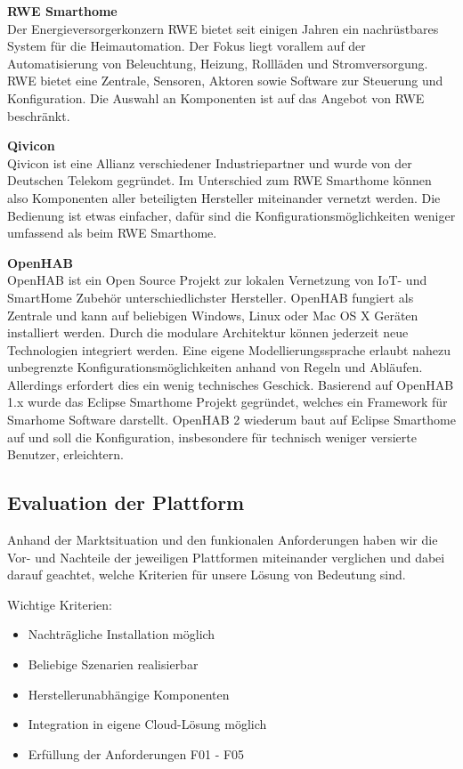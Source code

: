 \textbf{RWE Smarthome} \\
Der Energieversorgerkonzern RWE bietet seit einigen Jahren ein nachrüstbares System für die Heimautomation. Der Fokus liegt vorallem auf der Automatisierung von Beleuchtung, Heizung, Rollläden und Stromversorgung. RWE bietet eine Zentrale, Sensoren, Aktoren sowie Software zur Steuerung und Konfiguration. Die Auswahl an Komponenten ist auf das Angebot von RWE beschränkt.

\textbf{Qivicon} \\
Qivicon ist eine Allianz verschiedener Industriepartner und wurde von der Deutschen Telekom gegründet. Im Unterschied zum RWE Smarthome können also Komponenten aller beteiligten Hersteller miteinander vernetzt werden. Die Bedienung ist etwas einfacher, dafür sind die Konfigurationsmöglichkeiten weniger umfassend als beim RWE Smarthome.

\textbf{OpenHAB} \\
OpenHAB ist ein Open Source Projekt zur lokalen Vernetzung von IoT- und SmartHome Zubehör unterschiedlichster Hersteller. OpenHAB fungiert als Zentrale und kann auf beliebigen Windows, Linux oder Mac OS X Geräten installiert werden. Durch die modulare Architektur können jederzeit neue Technologien integriert werden. Eine eigene Modellierungssprache erlaubt nahezu unbegrenzte Konfigurationsmöglichkeiten anhand von Regeln und Abläufen. Allerdings erfordert dies ein wenig technisches Geschick. Basierend auf OpenHAB 1.x wurde das Eclipse Smarthome Projekt gegründet, welches ein Framework für Smarhome Software darstellt. OpenHAB 2 wiederum baut auf Eclipse Smarthome auf und soll die Konfiguration, insbesondere für technisch weniger versierte Benutzer, erleichtern.

\subsection{Evaluation der Plattform}
Anhand der Marktsituation und den funkionalen Anforderungen haben wir die Vor- und Nachteile der jeweiligen Plattformen miteinander verglichen und dabei darauf geachtet, welche Kriterien für unsere Lösung von Bedeutung sind.

Wichtige Kriterien:
\begin{itemize}
	\item Nachträgliche Installation möglich
	\item Beliebige Szenarien realisierbar
	\item Herstellerunabhängige Komponenten
	\item Integration in eigene Cloud-Lösung möglich
	\item Erfüllung der Anforderungen F01 - F05
\end{itemize}

